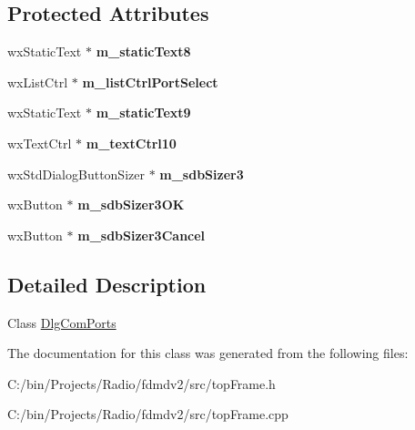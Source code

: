 \subsection*{Protected Attributes}
\begin{DoxyCompactItemize}
\item 
\hypertarget{class_dlg_com_ports_af0cbd9e67bbede8e5b1d4ef2941d4ad6}{wx\-Static\-Text $\ast$ {\bfseries m\-\_\-static\-Text8}}\label{class_dlg_com_ports_af0cbd9e67bbede8e5b1d4ef2941d4ad6}

\item 
\hypertarget{class_dlg_com_ports_a79fa4831dbf5e4aa13f239c23d1ca9a8}{wx\-List\-Ctrl $\ast$ {\bfseries m\-\_\-list\-Ctrl\-Port\-Select}}\label{class_dlg_com_ports_a79fa4831dbf5e4aa13f239c23d1ca9a8}

\item 
\hypertarget{class_dlg_com_ports_ae20ae58413be1c7932f9d83f37ccfe3e}{wx\-Static\-Text $\ast$ {\bfseries m\-\_\-static\-Text9}}\label{class_dlg_com_ports_ae20ae58413be1c7932f9d83f37ccfe3e}

\item 
\hypertarget{class_dlg_com_ports_a3f2305bfcbaa6ea63d78ad612b39e32c}{wx\-Text\-Ctrl $\ast$ {\bfseries m\-\_\-text\-Ctrl10}}\label{class_dlg_com_ports_a3f2305bfcbaa6ea63d78ad612b39e32c}

\item 
\hypertarget{class_dlg_com_ports_a11141b8001c743a769287b0f3f99061c}{wx\-Std\-Dialog\-Button\-Sizer $\ast$ {\bfseries m\-\_\-sdb\-Sizer3}}\label{class_dlg_com_ports_a11141b8001c743a769287b0f3f99061c}

\item 
\hypertarget{class_dlg_com_ports_a3148ae8add57c342e6f3446a25f743a5}{wx\-Button $\ast$ {\bfseries m\-\_\-sdb\-Sizer3\-O\-K}}\label{class_dlg_com_ports_a3148ae8add57c342e6f3446a25f743a5}

\item 
\hypertarget{class_dlg_com_ports_a887df8e54cc7986a49497afeecc1b04d}{wx\-Button $\ast$ {\bfseries m\-\_\-sdb\-Sizer3\-Cancel}}\label{class_dlg_com_ports_a887df8e54cc7986a49497afeecc1b04d}

\end{DoxyCompactItemize}


\subsection{Detailed Description}
Class \hyperlink{class_dlg_com_ports}{Dlg\-Com\-Ports} 

The documentation for this class was generated from the following files\-:\begin{DoxyCompactItemize}
\item 
C\-:/bin/\-Projects/\-Radio/fdmdv2/src/top\-Frame.\-h\item 
C\-:/bin/\-Projects/\-Radio/fdmdv2/src/top\-Frame.\-cpp\end{DoxyCompactItemize}

